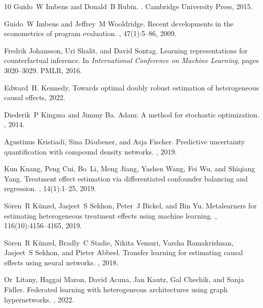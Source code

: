 \documentclass{article}
\begin{document}
\begin{thebibliography}{10}
	Guido~W Imbens and Donald~B Rubin.
	.
	\newblock Cambridge University Press, 2015.
	
	Guido~W Imbens and Jeffrey~M Wooldridge.
	\newblock Recent developments in the econometrics of program evaluation.
	, 47(1):5--86, 2009.
	
	Fredrik Johansson, Uri Shalit, and David Sontag.
	\newblock Learning representations for counterfactual inference.
	\newblock In {\em International Conference on Machine Learning}, pages
	3020--3029. PMLR, 2016.
	
	Edward~H. Kennedy.
	\newblock Towards optimal doubly robust estimation of heterogeneous causal
	effects, 2022.
	
	Diederik~P Kingma and Jimmy Ba.
	\newblock Adam: A method for stochastic optimization.
	, 2014.
	
	Agustinus Kristiadi, Sina D{\"a}ubener, and Asja Fischer.
	\newblock Predictive uncertainty quantification with compound density networks.
	, 2019.
	
	Kun Kuang, Peng Cui, Bo~Li, Meng Jiang, Yashen Wang, Fei Wu, and Shiqiang Yang.
	\newblock Treatment effect estimation via differentiated confounder balancing
	and regression.
	,
	14(1):1--25, 2019.
	
	S{\"o}ren~R K{\"u}nzel, Jasjeet~S Sekhon, Peter~J Bickel, and Bin Yu.
	\newblock Metalearners for estimating heterogeneous treatment effects using
	machine learning.
	,
	116(10):4156--4165, 2019.
	
	S{\"o}ren~R K{\"u}nzel, Bradly~C Stadie, Nikita Vemuri, Varsha Ramakrishnan,
	Jasjeet~S Sekhon, and Pieter Abbeel.
	\newblock Transfer learning for estimating causal effects using neural
	networks.
	, 2018.
	
	Or~Litany, Haggai Maron, David Acuna, Jan Kautz, Gal Chechik, and Sanja Fidler.
	\newblock Federated learning with heterogeneous architectures using graph
	hypernetworks.
	, 2022.
	

\end{thebibliography}
\end{document}
